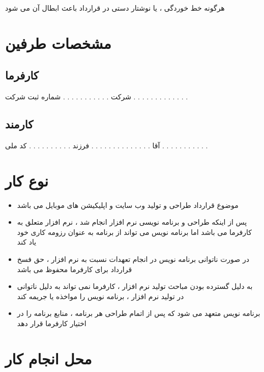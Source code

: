 \documentclass[12pt]{article}
\begin{document}
\begin{tcolorbox}[
title=تبصره 1
]
هرگونه خط خوردگی ، یا نوشتار دستی در قرارداد باعث ابطال آن می شود 
\end{tcolorbox}




\section{مشخصات طرفین}


\subsection{کارفرما}


شرکت  . . . . . . . . . . .  شماره ثبت شرکت . . . . . . . . . . . . .

\subsection{کارمند}


آقا . . . . . . . . . . . . . . فرزند . . . . . . . . . .  کد ملی . . . . . . . . . . .



\section{نوع کار}


\begin{itemize}
	\item موضوع قرارداد طراحی و تولید وب سایت و اپلیکیشن های موبایل می باشد
	\item  پس از اینکه طراحی و برنامه نویسی نرم افزار انجام شد ، 
	نرم افزار متعلق به کارفرما می باشد اما برنامه نویس می تواند از برنامه به عنوان رزومه کاری خود یاد کند
	\item در صورت ناتوانی برنامه نویس در انجام تعهدات نسبت به نرم افزار ، حق فسخ قرارداد برای کارفرما محفوظ می باشد
	\item به دلیل گسترده بودن مباحث تولید نرم افزار ، 
	کارفرما نمی تواند به دلیل ناتوانی در تولید نرم افزار ، برنامه نویس را مواخذه یا جریمه کند
	\item برنامه نویس متعهد می شود که پس از اتمام طراحی هر برنامه   ، منابع برنامه را در اختیار کارفرما قرار دهد
\end{itemize}



\section{محل انجام کار}
\end{document}

